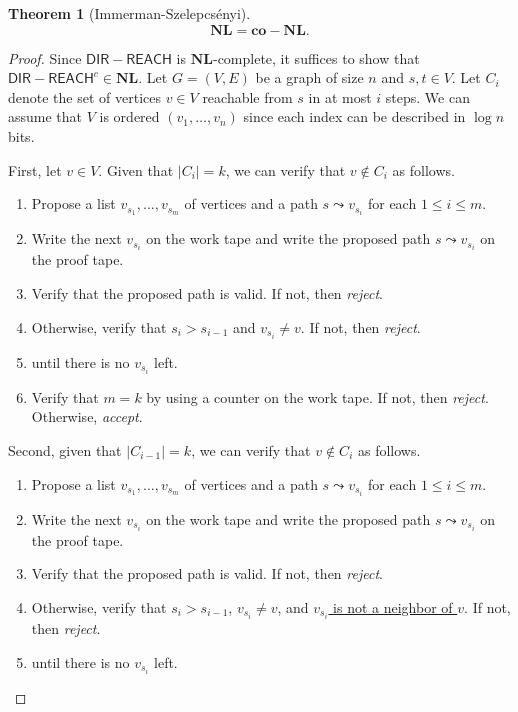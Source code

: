\documentclass[10pt,letterpaper,cm]{nupset}
\theoremstyle{definition}
\theoremstyle{theorem}
\newtheorem{theorem}[definition]{Theorem}
\theoremstyle{remark}
\newcommand{\1}{\mathbf{1}}
\newcommand{\0}{\vec 0}
\begin{document}
\begin{theorem}[Immerman-Szelepcs\'enyi]
$$\mathbf{NL} = \mathbf{co}{-}{\mathbf{NL}}.$$
\end{theorem}
\begin{proof}
Since $\mathsf{DIR{-}REACH}$ is $\mathbf{NL}$-complete, it suffices to show that $\mathsf{DIR{-}REACH}^c\in \mathbf{NL}.$  
Let $G= (V,E)$ be a graph of size $n$ and $s, t\in V$. Let $C_i$ denote the set of vertices $v\in V$ reachable from $s$ in at most $i$ steps. We can assume that $V$ is ordered $(v_1, \ldots, v_n)$ since each index can be described in $\log{n}$ bits.

\medskip

 First, let $v\in V$. Given that $|C_i| = k$, we can verify that $v \notin C_i$ as follows. 
\begin{enumerate}
\item Propose a list $v_{s_1}, \ldots, v_{s_m}$ of vertices and a path $s\leadsto v_{s_i}$ for each $1\leq i \leq m$. 
\item Write the next $v_{s_i}$ on the work tape and write the proposed path $s \leadsto v_{s_i}$ on the proof tape. 
\item Verify that the proposed path is valid. If not, then \textit{reject}.
\item Otherwise, verify that $s_i > s_{i-1}$ and $v_{s_i} \ne v$. If not, then \textit{reject}. 
\item {} until there is no $v_{s_i}$ left. 
\item Verify that $m = k$ by using a counter on the work tape. If not, then \textit{reject}. Otherwise, \textit{accept}.
\end{enumerate}
Second, given that $|C_{i-1}| = k$,  we can verify that $v\notin C_i$ as follows.
\begin{enumerate}
\item Propose a list $v_{s_1}, \ldots, v_{s_m}$ of vertices and a path $s\leadsto v_{s_i}$ for each $1\leq i \leq m$. 
\item Write the next $v_{s_i}$ on the work tape and write the proposed path $s \leadsto v_{s_i}$ on the proof tape. 
\item Verify that the proposed path is valid. If not, then \textit{reject}.
\item Otherwise, verify that $s_i > s_{i-1}$, $v_{s_i} \ne v$, and \underline{$v_{s_i}$ is not a neighbor of $v$}. If not, then \textit{reject}. 
\item {} until there is no $v_{s_i}$ left. 

\end{enumerate}
\end{proof}
\end{document}
